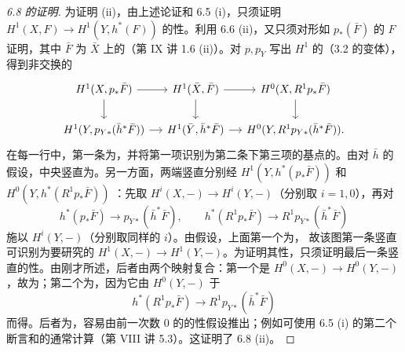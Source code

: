 \begin{proof}[6.8 的证明]
为证明 (ii)，由上述论证和 6.5 (i)，只须证明 $H^1(X,F)\to H^1(Y,h^*(F))$ 的性。利用 6.6 (ii)，又只须对形如 $p_*(\bar F)$ 的 $F$ 证明，其中 $\bar F$ 为 $\bar X$ 上的（第 IX 讲 1.6 (ii)）。对 $p,p_Y$ 写出 $H^1$ 的（3.2 的变体），得到非交换的
\[
\begin{tikzcd}[column sep=small]
H^1(X,p_*\bar F)\arrow[r]\arrow[d]&H^1(\bar X,\bar F)\arrow[r]\arrow[d]&H^0(X,R^1p_*\bar F)\arrow[d]\\
H^1(Y,p_{Y*}(\bar h^*\bar F))\arrow[r]&H^1(\bar Y,\bar h^*\bar F)\arrow[r]&H^0(Y,R^1p_{Y*}(\bar h^*\bar F)).
\end{tikzcd}
\]
在每一行中，第一条为，并将第一项识别为第二条下第三项的基点的。由对 $\bar h$ 的假设，中央竖直为。另一方面，两端竖直分别经 $H^1(Y,h^*(p_*\bar F))$ 和 $H^0(Y,h^*(R^1p_*\bar F))$ ：先取 $H^i(X,-)\to H^i(Y,-)$（分别取 $i=1,0$），再对
\[
h^*(p_*\bar F)\longrightarrow p_{Y*}(\bar h^*\bar F),\qquad
h^*(R^1p_*\bar F)\longrightarrow R^1p_{Y*}(\bar h^*\bar F)
\]
施以 $H^i(Y,-)$（分别取同样的 $i$）。由假设，上面第一个为，
故该图第一条竖直可识别为要研究的 $H^1(X,-)\to H^1(Y,-)$。为证明其性，只须证明最后一条竖直的性。由刚才所述，后者由两个映射复合：第一个是 $H^0(X,-)\to H^0(Y,-)$，故为；第二个为，因为它由 $H^0(Y,-)$ 于
\[
h^*(R^1p_*\bar F)\longrightarrow R^1p_{Y*}(\bar h^*\bar F)
\]
而得。后者为，容易由前一次数 $0$ 的的性假设推出；例如可使用 6.5 (i) 的第二个断言和的通常计算（第 VIII 讲 5.3）。这证明了 6.8 (ii)。


\end{proof}
